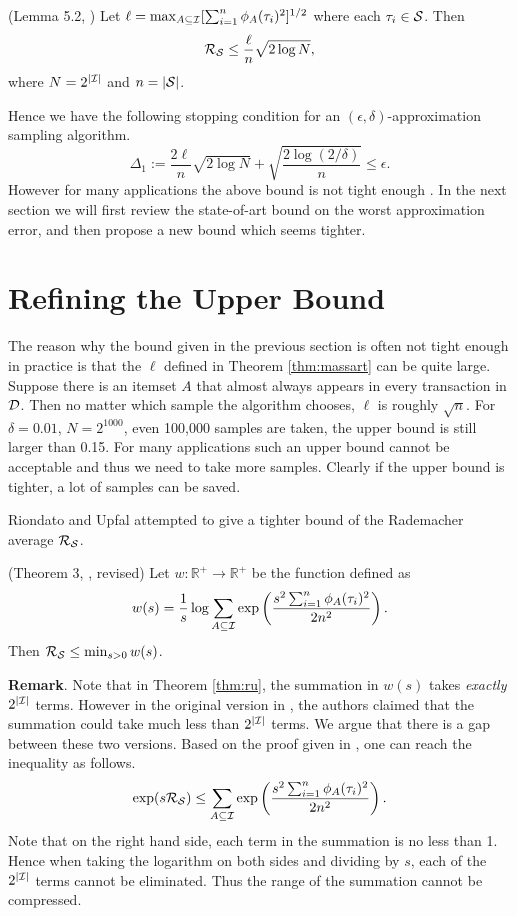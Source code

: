 \documentclass{article}
\begin{document}
\begin{theorem}
\label{thm:massart}
(Lemma 5.2, \cite{Mas00}) Let $\ell = \max_{A\subseteq\mathcal{I}} [\sum_{i=1}^n\phi_A(\tau_i)^2]^{1/2}$ where each $\tau_i\in\mathcal{S}$. Then
$$\mathcal{R}_{\mathcal{S}} \leq \frac{\ell}{n}\sqrt{2\log N},$$
where $N = 2^{|\mathcal{I}|}$ and $n = |\mathcal{S}|$.
\end{theorem}
Hence we have the following stopping condition for an $(\epsilon,\delta)$-approximation sampling algorithm.
$$\Delta_1 := \frac{2\ell}{n}\sqrt{2\log N} + \sqrt{\frac{2\log(2/\delta)}{n}} \leq \epsilon.$$
However for many applications the above bound is not tight enough \cite{RU15,RU16}. In the next section we will first review the state-of-art bound on the worst approximation error, and then propose a new bound which seems tighter.

\section{Refining the Upper Bound}
\label{sec:refine}
The reason why the bound given in the previous section is often not tight enough in practice is that the $\ell$ defined in Theorem \ref{thm:massart} can be quite large. Suppose there is an itemset $A$ that almost always appears in every transaction in $\mathcal{D}$. Then no matter which sample the algorithm chooses, $\ell$ is roughly $\sqrt{n}$. For $\delta=0.01$, $N = 2^{1000}$, even 100,000 samples are taken, the upper bound is still larger than 0.15. For many applications such an upper bound cannot be acceptable and thus we need to take more samples. Clearly if the upper bound is tighter, a lot of samples can be saved.

Riondato and Upfal \cite{RU15} attempted to give a tighter bound of the Rademacher average $\mathcal{R}_{\mathcal{S}}$. 

\begin{theorem}
\label{thm:ru}
(Theorem 3, \cite{RU15}, revised) Let $w : \mathbb{R}^+ \to \mathbb{R}^+$ be the function defined as
$$w(s) = \frac{1}{s}\log \sum_{A\subseteq\mathcal{I}}\exp\left(\frac{s^2 \sum_{i=1}^n \phi_A(\tau_i)^2}{2n^2}\right).$$
Then $\mathcal{R}_{\mathcal{S}} \leq \min_{s>0} w(s)$.
\end{theorem}

{\bf Remark}. Note that in Theorem \ref{thm:ru}, the summation in $w(s)$ takes \emph{exactly} $2^{|\mathcal{I}|}$ terms. However in the original version in \cite{RU15}, the authors claimed that the summation could take much less than $2^{|\mathcal{I}|}$ terms. We argue that there is a gap between these two versions. Based on the proof given in \cite{RU15}, one can reach the inequality as follows.
\begin{equation}
\label{eqn:ru}\exp(s\mathcal{R}_{\mathcal{S}}) \leq \sum_{A\subseteq\mathcal{I}}\exp\left(\frac{s^2\sum_{i=1}^n \phi_A(\tau_i)^2}{2n^2}\right).
\end{equation}
Note that on the right hand side, each term in the summation is no less than 1. Hence when taking the logarithm on both sides and dividing by $s$, each of the $2^{|\mathcal{I}|}$ terms cannot be eliminated. Thus the range of the summation cannot be compressed.
\end{document}
